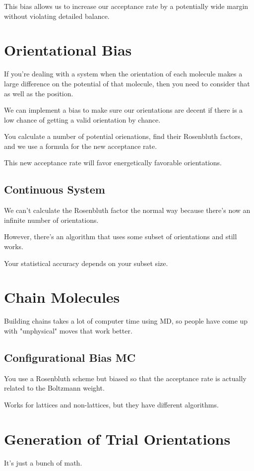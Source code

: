 \documentclass[fleqn]{report}
\begin{document}
This bias allows us to increase our acceptance rate by a potentially wide 
margin without violating detailed balance. 

\section{Orientational Bias}
If you're dealing with a system when the orientation of each molecule makes 
a large difference on the potential of that molecule, then you need to consider 
that as well as the position. 

We can implement a bias to make sure our orientations are decent if there is 
a low chance of getting a valid orientation by chance. 

You calculate a number of potential orienations, find their Rosenbluth 
factors, and we use a formula for the new acceptance rate. 

This new acceptance rate will favor energetically favorable orientations. 

\subsection{Continuous System}
We can't calculate the Rosenbluth factor the normal way because there's 
now an infinite number of orientations. 

However, there's an algorithm that uses some subset of orientations and still 
works. 

Your statistical accuracy depends on your subset size. 

\section{Chain Molecules}
Building chains takes a lot of computer time using MD, so people have come 
up with "unphysical" moves that work better.

\subsection{Configurational Bias MC}
You use a Rosenbluth scheme but biased so that the acceptance rate 
is actually related to the Boltzmann weight. 

Works for lattices and non-lattices, but they have different algorithms.

\section{Generation of Trial Orientations}
It's just a bunch of math. 
\end{document}
